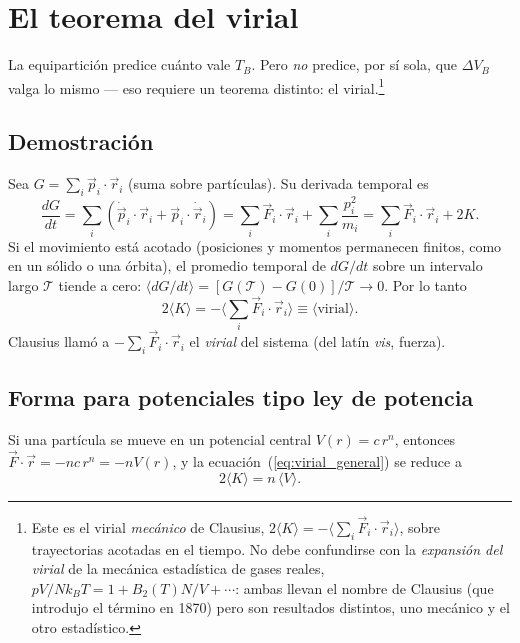 \documentclass[11pt,a4paper]{article}
\begin{document}
\section{El teorema del virial}
\label{sec:virial_teo}

La equipartición predice cuánto vale $T_B$. Pero \emph{no} predice, por sí
sola, que $\Delta V_B$ valga lo mismo --- eso requiere un teorema distinto:
el virial.\footnote{Este es el virial \emph{mecánico} de Clausius,
$2\langle K\rangle=-\langle\sum_i\vec F_i\cdot\vec r_i\rangle$, sobre
trayectorias acotadas en el tiempo. No debe confundirse con la
\emph{expansión del virial} de la mecánica estadística de gases reales,
$pV/Nk_BT=1+B_2(T)N/V+\cdots$: ambas llevan el nombre de Clausius (que
introdujo el término en 1870) pero son resultados distintos, uno mecánico
y el otro estadístico.}

\subsection{Demostración}

Sea $G = \sum_i \vec p_i \cdot \vec r_i$ (suma sobre partículas). Su
derivada temporal es
\[ \frac{dG}{dt} = \sum_i \left(\dot{\vec p}_i\cdot\vec r_i
   + \vec p_i\cdot\dot{\vec r}_i\right)
   = \sum_i \vec F_i\cdot\vec r_i + \sum_i \frac{p_i^2}{m_i}
   = \sum_i \vec F_i\cdot\vec r_i + 2K. \]
Si el movimiento está acotado (posiciones y momentos permanecen finitos,
como en un sólido o una órbita), el promedio temporal de $dG/dt$ sobre un
intervalo largo $\mathcal T$ tiende a cero:
$\langle dG/dt\rangle = [G(\mathcal T)-G(0)]/\mathcal T \to 0$. Por lo
tanto
\begin{equation}
2\langle K\rangle = -\Big\langle\sum_i \vec F_i\cdot\vec r_i\Big\rangle
\equiv \langle \text{virial}\rangle.
\label{eq:virial_general}
\end{equation}
Clausius llamó a $-\sum_i\vec F_i\cdot\vec r_i$ el \emph{virial} del
sistema (del latín \textit{vis}, fuerza).

\subsection{Forma para potenciales tipo ley de potencia}

Si una partícula se mueve en un potencial central $V(r)=c\,r^n$, entonces
$\vec F\cdot\vec r = -nc\,r^n = -nV(r)$, y la
ecuación~(\ref{eq:virial_general}) se reduce a
\begin{equation}
2\langle K\rangle = n\,\langle V\rangle.
\label{eq:virial_potencia}
\end{equation}
\end{document}
